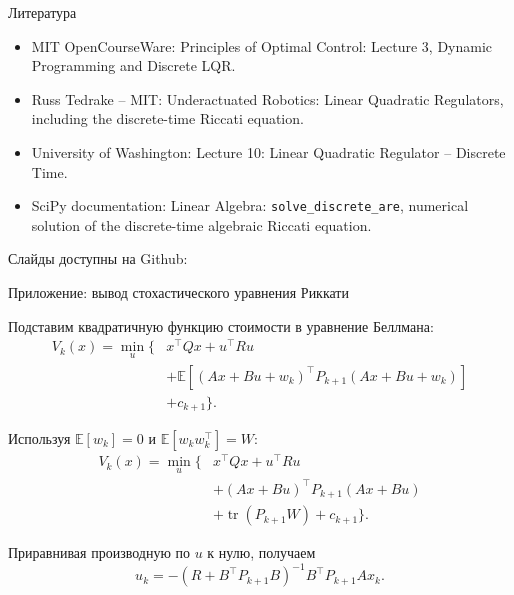\documentclass{beamer}
\newcommand{\myqrframe}{
	\begin{frame}
		\begin{center}
			\centerline{Слайды доступны на Github:}
			\bigskip
			\centerline{\mygit}
			\bigskip
			\myqr
		\end{center}
	\end{frame}
}
\begin{document}
	\begin{frame}{Литература}
		\begin{itemize}
			
			\item MIT OpenCourseWare:
			{Principles of Optimal Control: Lecture 3, Dynamic Programming and Discrete LQR.}
			
			\item Russ Tedrake -- MIT:
			{Underactuated Robotics: Linear Quadratic Regulators, including the discrete-time Riccati equation.}
			
			\item University of Washington:
			{Lecture 10: Linear Quadratic Regulator -- Discrete Time.}
			
			\item SciPy documentation:
			{Linear Algebra: \texttt{solve\_discrete\_are}, numerical solution of the discrete-time algebraic Riccati equation.}
			
		\end{itemize}
	\end{frame}
	
	
	\myqrframe
	
	\begin{frame}{Приложение: вывод стохастического уравнения Риккати}
		\begin{flushleft}
			Подставим квадратичную функцию стоимости в уравнение Беллмана:
			\[
			\begin{aligned}
				V_k(x)=\min_u\big\{&
				x^\top Qx+u^\top Ru\\
				&+\mathbb{E}[
				(Ax+Bu+w_k)^\top P_{k+1}
				(Ax+Bu+w_k)]\\
				&+c_{k+1}\big\}.
			\end{aligned}
			\]
			
			Используя $\mathbb{E}[w_k]=0$ и
			$\mathbb{E}[w_kw_k^\top]=W$:
			\[
			\begin{aligned}
				V_k(x)=\min_u\big\{&
				x^\top Qx+u^\top Ru\\
				&+(Ax+Bu)^\top P_{k+1}(Ax+Bu)\\
				&+\operatorname{tr}(P_{k+1}W)+c_{k+1}
				\big\}.
			\end{aligned}
			\]
			
			
			Приравнивая производную по $u$ к нулю, получаем
			\[
			u_k=-(R+B^\top P_{k+1}B)^{-1}
			B^\top P_{k+1}Ax_k.
			\]
			
		\end{flushleft}
	\end{frame}
	
\end{document}
